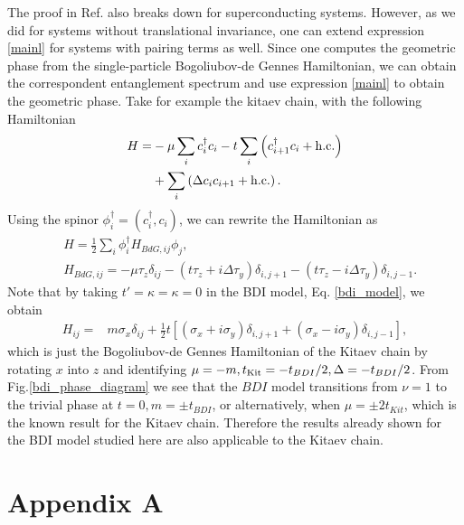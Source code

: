 \documentclass[prb,twocolumn,amsmath,longbibliography,amssymb,superscriptaddress]{revtex4-1}
\begin{document}
The proof in Ref.\cite{Zaletel2014} also breaks down for superconducting systems. However, as we did for systems without translational invariance, one can extend expression \ref{mainl} for systems with pairing terms as well. Since one computes the geometric phase from the single-particle Bogoliubov-de Gennes Hamiltonian, we can obtain the correspondent entanglement spectrum and use expression \ref{mainl} to obtain the geometric phase. Take for example the kitaev chain, with the following Hamiltonian
\begin{align*}
H =& -\mu \sum_{i} c_i^\dagger c_i - t \sum_{i}\left( c_{i+1}^\dagger c_i + {\rm h.c.}\right) \\
&+  \sum_{i}\left( \Delta c_{i} c_{i+1} + {\rm h.c.}\right).
\end{align*}
Using the spinor $\phi_i^\dagger = (c_i^\dagger, c_i)$, we can rewrite the Hamiltonian as
\begin{align*}
&H = \frac{1}{2}\sum_i \phi^\dagger_i H_{BdG,ij} \phi_j,\\
&H_{BdG,ij} = -\mu \tau_z \delta_{ij} - (t \tau_z + i\Delta \tau_y )\delta_{i,j+1}- (t \tau_z - i\Delta \tau_y)\delta_{i,j-1}.
\end{align*}
Note that by taking $t' = \kappa = \kappa = 0$ in the BDI model, Eq. \ref{bdi_model}, we obtain
\begin{align*}
H_{ij} =& m \sigma_x\delta_{ij} + \frac{1}{2} t \left[(\sigma_x + i \sigma_y)\delta_{i,j+1} + (\sigma_x - i \sigma_y) \delta_{i,j-1} \right],
\end{align*}
which is just the Bogoliubov-de Gennes Hamiltonian of the Kitaev chain by rotating $x$ into $z$ and identifying $\mu = -m, t_{\rm Kit} = -t_{BDI}/2, \Delta = -t_{BDI}/2 $. From Fig.\ref{bdi_phase_diagram} we see that the $BDI$ model transitions from $\nu = 1$ to the trivial phase at $t=0, m=\pm t_{BDI}$, or alternatively, when $\mu = \pm 2 t_{Kit}$, which is the known result for the Kitaev chain. Therefore the results already shown for the BDI model studied here are also applicable to the Kitaev chain.  

	
	
\appendix

\section{Appendix A}
	
\end{document}
